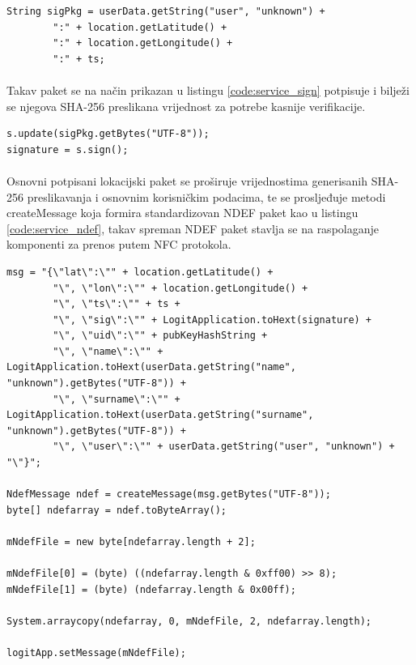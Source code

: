 \begin{code}
\begin{verbatim}
String sigPkg = userData.getString("user", "unknown") +
        ":" + location.getLatitude() +
        ":" + location.getLongitude() +
        ":" + ts;
\end{verbatim}
\label{code:service_package}
\end{code}

\paragraph*{}
Takav paket se na način prikazan u listingu \ref{code:service_sign} potpisuje i bilježi se njegova SHA-256 preslikana vrijednost za potrebe kasnije verifikacije.

\begin{code}
\begin{verbatim}
s.update(sigPkg.getBytes("UTF-8"));
signature = s.sign();
\end{verbatim}
\label{code:service_sign}
\end{code}

\paragraph*{}
Osnovni potpisani lokacijski paket se proširuje vrijednostima generisanih SHA-256 preslikavanja i osnovnim korisničkim podacima, te se prosljeđuje metodi createMessage koja formira standardizovan NDEF paket kao u listingu \ref{code:service_ndef}, takav spreman NDEF paket stavlja se na raspolaganje komponenti za prenos putem NFC protokola.

\begin{code}
\begin{verbatim}
msg = "{\"lat\":\"" + location.getLatitude() +
        "\", \"lon\":\"" + location.getLongitude() +
        "\", \"ts\":\"" + ts +
        "\", \"sig\":\"" + LogitApplication.toHext(signature) +
        "\", \"uid\":\"" + pubKeyHashString +
        "\", \"name\":\"" + LogitApplication.toHext(userData.getString("name", "unknown").getBytes("UTF-8")) +
        "\", \"surname\":\"" + LogitApplication.toHext(userData.getString("surname", "unknown").getBytes("UTF-8")) +
        "\", \"user\":\"" + userData.getString("user", "unknown") + "\"}";

NdefMessage ndef = createMessage(msg.getBytes("UTF-8"));
byte[] ndefarray = ndef.toByteArray();

mNdefFile = new byte[ndefarray.length + 2];

mNdefFile[0] = (byte) ((ndefarray.length & 0xff00) >> 8);
mNdefFile[1] = (byte) (ndefarray.length & 0x00ff);

System.arraycopy(ndefarray, 0, mNdefFile, 2, ndefarray.length);

logitApp.setMessage(mNdefFile);
\end{verbatim}
\label{code:service_ndef}
\end{code}

